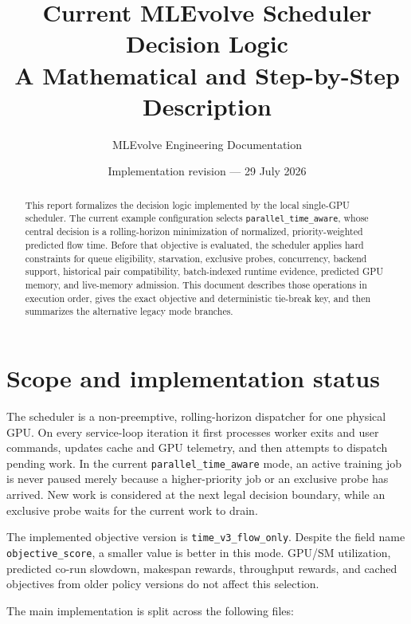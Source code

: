 \documentclass[11pt]{article}
\title{Current MLEvolve Scheduler Decision Logic\\
       \large A Mathematical and Step-by-Step Description}
\author{MLEvolve Engineering Documentation}
\date{Implementation revision \code{2d845eb} --- 29 July 2026}
\newcommand{\code}[1]{\textcolor{codeblue}{\texttt{#1}}}
\begin{document}
\maketitle

\begin{abstract}
This report formalizes the decision logic implemented by the local single-GPU
scheduler.  The current example configuration selects
\code{parallel\_time\_aware}, whose central decision is a rolling-horizon
minimization of normalized, priority-weighted predicted flow time.  Before that
objective is evaluated, the scheduler applies hard constraints for queue
eligibility, starvation, exclusive probes, concurrency, backend support,
historical pair compatibility, batch-indexed runtime evidence, predicted GPU
memory, and live-memory admission.  This document describes those operations in
execution order, gives the exact objective and deterministic tie-break key, and
then summarizes the alternative legacy mode branches.
\end{abstract}

\tableofcontents

\section{Scope and implementation status}

The scheduler is a non-preemptive, rolling-horizon dispatcher for one physical
GPU.  On every service-loop iteration it first processes worker exits and user
commands, updates cache and GPU telemetry, and then attempts to dispatch pending
work.  In the current \code{parallel\_time\_aware} mode, an active training job
is never paused merely because a higher-priority job or an exclusive probe has
arrived.  New work is considered at the next legal decision boundary, while an
exclusive probe waits for the current work to drain.

The implemented objective version is
\code{time\_v3\_flow\_only}.  Despite the field name
\code{objective\_score}, a smaller value is better in this mode.  GPU/SM
utilization, predicted co-run slowdown, makespan rewards, throughput rewards,
and cached objectives from older policy versions do not affect this selection.

The main implementation is split across the following files:
\end{document}
